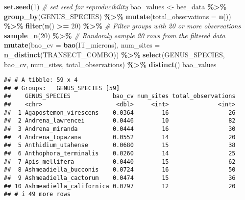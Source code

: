 \documentclass[
]{article}
\newenvironment{Shaded}{\begin{snugshade}}{\end{snugshade}}
\newcommand{\AttributeTok}[1]{\textcolor[rgb]{0.13,0.29,0.53}{#1}}
\newcommand{\CommentTok}[1]{\textcolor[rgb]{0.56,0.35,0.01}{\textit{#1}}}
\newcommand{\DecValTok}[1]{\textcolor[rgb]{0.00,0.00,0.81}{#1}}
\newcommand{\FunctionTok}[1]{\textcolor[rgb]{0.13,0.29,0.53}{\textbf{#1}}}
\newcommand{\NormalTok}[1]{#1}
\newcommand{\OtherTok}[1]{\textcolor[rgb]{0.56,0.35,0.01}{#1}}
\newcommand{\SpecialCharTok}[1]{\textcolor[rgb]{0.81,0.36,0.00}{\textbf{#1}}}
\begin{document}
\begin{Shaded}
\begin{Highlighting}[]
\FunctionTok{set.seed}\NormalTok{(}\DecValTok{1}\NormalTok{) }\CommentTok{\# set seed for reproducibility}
\NormalTok{bao\_values }\OtherTok{\textless{}{-}}\NormalTok{ bee\_data }\SpecialCharTok{\%\textgreater{}\%}
  \FunctionTok{group\_by}\NormalTok{(GENUS\_SPECIES) }\SpecialCharTok{\%\textgreater{}\%}  
  \FunctionTok{mutate}\NormalTok{(}\AttributeTok{total\_observations =} \FunctionTok{n}\NormalTok{()) }\SpecialCharTok{\%\textgreater{}\%} 
  \FunctionTok{filter}\NormalTok{(}\FunctionTok{n}\NormalTok{() }\SpecialCharTok{\textgreater{}=} \DecValTok{20}\NormalTok{) }\SpecialCharTok{\%\textgreater{}\%}                        \CommentTok{\# Filter groups with 20 or more observations}
  \FunctionTok{sample\_n}\NormalTok{(}\DecValTok{20}\NormalTok{) }\SpecialCharTok{\%\textgreater{}\%}                             \CommentTok{\# Randomly sample 20 rows from the filtered data}
  \FunctionTok{mutate}\NormalTok{(}\AttributeTok{bao\_cv =} \FunctionTok{bao}\NormalTok{(IT\_microns), }
    \AttributeTok{num\_sites =} \FunctionTok{n\_distinct}\NormalTok{(TRANSECT\_COMBO)) }\SpecialCharTok{\%\textgreater{}\%}
  \FunctionTok{select}\NormalTok{(GENUS\_SPECIES, bao\_cv, num\_sites, total\_observations) }\SpecialCharTok{\%\textgreater{}\%}
  \FunctionTok{distinct}\NormalTok{()}
\NormalTok{bao\_values}
\end{Highlighting}
\end{Shaded}

\begin{verbatim}
## # A tibble: 59 x 4
## # Groups:   GENUS_SPECIES [59]
##    GENUS_SPECIES            bao_cv num_sites total_observations
##    <chr>                     <dbl>     <int>              <int>
##  1 Agapostemon_virescens    0.0364        16                 26
##  2 Andrena_lawrencei        0.0446        10                 82
##  3 Andrena_miranda          0.0444        16                 30
##  4 Andrena_topazana         0.0552        14                 20
##  5 Anthidium_utahense       0.0680        15                 38
##  6 Anthophora_terminalis    0.0260        14                 25
##  7 Apis_mellifera           0.0440        15                 62
##  8 Ashmeadiella_bucconis    0.0724        16                 50
##  9 Ashmeadiella_cactorum    0.0474        15                 36
## 10 Ashmeadiella_californica 0.0797        12                 20
## # i 49 more rows
\end{verbatim}
\end{document}
